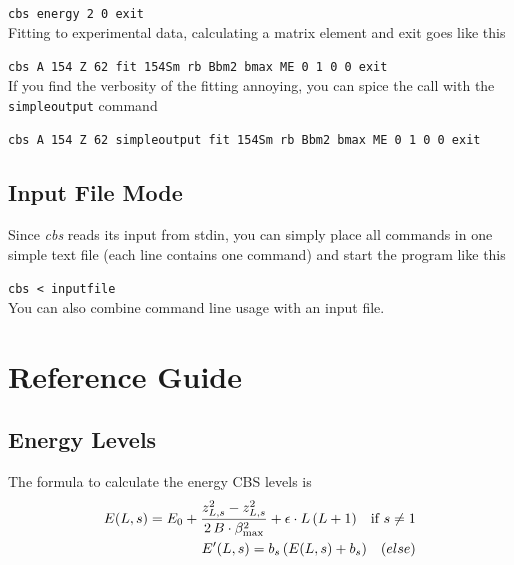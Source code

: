 \documentclass[10pt,a4paper]{article}
\begin{document}
\verb!cbs energy 2 0 exit! \\
Fitting to experimental data, calculating a matrix element and exit goes like this

\verb!cbs A 154 Z 62 fit 154Sm rb Bbm2 bmax ME 0 1 0 0 exit! \\
If you find the verbosity of the fitting annoying, you can spice the call with the \verb!simpleoutput! command

\verb!cbs A 154 Z 62 simpleoutput fit 154Sm rb Bbm2 bmax ME 0 1 0 0 exit!

\subsection{Input File Mode}
Since \textit{cbs} reads its input from stdin, you can simply place all commands in one simple text file (each line contains one command) and start the program like this

\verb!cbs < inputfile! \\
You can also combine command line usage with an input file.


\section{Reference Guide} \label{ReferenceGuide}
\subsection{Energy Levels}
The formula to calculate the energy CBS levels is
\begin{align}
E(L,s) = E_0 
     + \frac{z_{L,s}^2 - z_{L,s}^2}{2 \, B\cdot\beta_{\rm max}^2}
	 + \epsilon \cdot L\,(L+1)
	\quad \text{if $s\neq1$} \\
E'(L,s) = b_s \, (E(L,s)+b_s) \quad \text(else)
\end{align}
\end{document}
